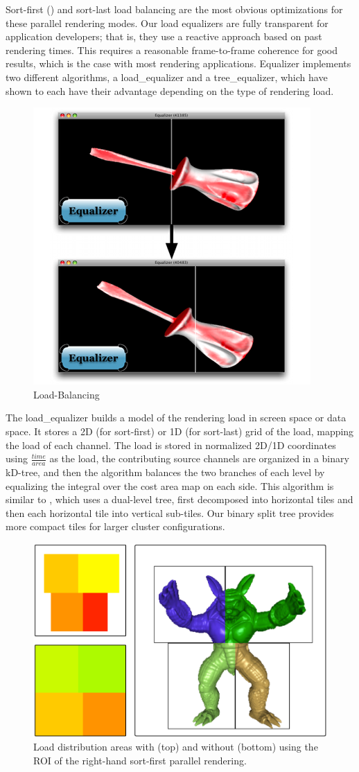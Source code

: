 Sort-first () and sort-last load balancing are the most obvious
optimizations for these parallel rendering modes. Our load equalizers are fully
transparent for application developers; that is, they use a reactive approach
based on past rendering times. This requires a reasonable frame-to-frame
coherence for good results, which is the case with most rendering applications.
Equalizer implements two different algorithms, a \textsf{load\_equalizer} and a
\textsf{tree\_equalizer}, which have shown to each have their advantage
depending on the type of rendering load.

\begin{figure}
  \includegraphics[width=.382\textwidth]{images/loadeq}
  \caption{\label{floadeq}Load-Balancing}
\end{figure}

The \textsf{load\_equalizer} builds a model of the rendering load in screen
space or data space. It stores a 2D (for sort-first) or 1D (for sort-last) grid
of the load, mapping the load of each channel. The load is stored in normalized
2D/1D coordinates using $\frac{time}{area}$ as the load, the contributing source
channels are organized in a binary kD-tree, and then the algorithm balances the
two branches of each level by equalizing the integral over the cost area map on
each side. This algorithm is similar to \cite{ACCC:04}, which uses a dual-level
tree, first decomposed into horizontal tiles and then each horizontal tile into
vertical sub-tiles. Our binary split tree provides more compact tiles for larger
cluster configurations.

\begin{figure}
  \includegraphics[width=.382\textwidth]{images/roi}
  \caption{Load distribution areas with (top) and without (bottom) using the ROI
    of the right-hand sort-first parallel rendering.}
  \label{fROI}
\end{figure}

